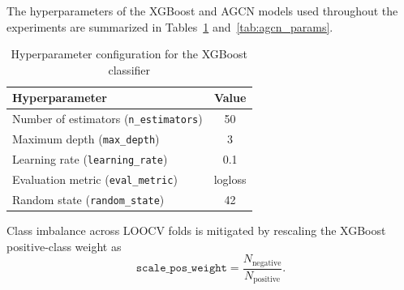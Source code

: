 The hyperparameters of the XGBoost and AGCN models used throughout the experiments are summarized in Tables~\ref{tab:xgboost_params} and~\ref{tab:agcn_params}.

\begin{table}[H]
    \centering
    \caption{Hyperparameter configuration for the XGBoost classifier}
    \label{tab:xgboost_params}
    \small
    \setlength{\tabcolsep}{12pt}
    \begin{tabularx}{\linewidth}{>{\raggedright\arraybackslash}X c}
        \hline
        Hyperparameter & Value \\
        \hline
        Number of estimators (\texttt{n\_estimators})       & 50 \\
        Maximum depth (\texttt{max\_depth})                  & 3 \\
        Learning rate (\texttt{learning\_rate})              & 0.1 \\
        Evaluation metric (\texttt{eval\_metric})            & logloss \\
        Random state (\texttt{random\_state})                & 42 \\
        \hline
    \end{tabularx}
\end{table}

Class imbalance across LOOCV folds is mitigated by rescaling the XGBoost positive-class weight as
\begin{equation}
    \texttt{scale\_pos\_weight} = \frac{N_{\text{negative}}}{N_{\text{positive}}}.
\end{equation}

